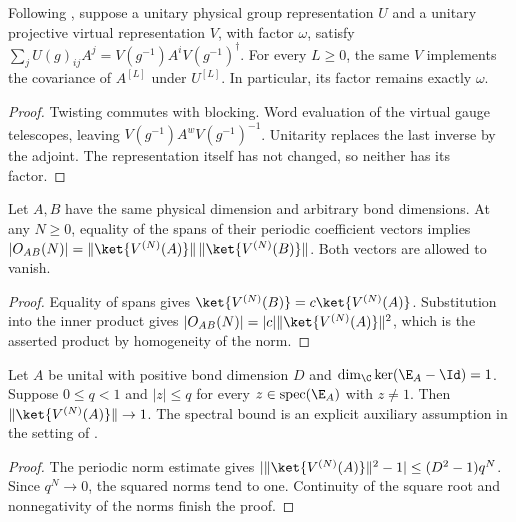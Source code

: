 \begin{lemma}
    \label{thm:spc_aux_blocked_unitary_covariance}
    \leanok
    Following \cite[Appendix~C, lines~2653--2717]{Schuch2011Phases}, suppose
    a unitary physical group representation $U$ and a unitary
    projective virtual representation $V$, with factor $\omega$, satisfy
    $\sum_jU(g)_{ij}A^j=V(g^{-1})A^iV(g^{-1})^\dagger$.
    For every $L\geq0$, the same $V$ implements the covariance of $A^{[L]}$
    under $U^{[L]}$. In particular, its factor remains exactly $\omega$.
\end{lemma}
\begin{proof}\leanok
    Twisting commutes with blocking. Word evaluation of the virtual gauge
    telescopes, leaving $V(g^{-1})A^wV(g^{-1})^{-1}$.
    Unitarity replaces the last inverse by the adjoint. The representation
    itself has not changed, so neither has its factor.
\end{proof}

\begin{lemma}
    \label{thm:spc_aux_periodic_span_overlap}
    \leanok
    Let $A,B$ have the same physical dimension and arbitrary bond dimensions.
    At any $N\geq0$, equality of the spans of their periodic coefficient
    vectors implies
    $|O_{AB}(N)|=\|\ket{V^{(N)}(A)}\|\,\|\ket{V^{(N)}(B)}\|$.
    Both vectors are allowed to vanish.
\end{lemma}
\begin{proof}\leanok
    Equality of spans gives $\ket{V^{(N)}(B)}=c\ket{V^{(N)}(A)}$.
    Substitution into the inner product gives
    $|O_{AB}(N)|=|c|\|\ket{V^{(N)}(A)}\|^2$, which is the asserted
    product by homogeneity of the norm.
\end{proof}

\begin{lemma}
    \label{thm:spc_aux_periodic_norm_one}
    \leanok
    Let $A$ be unital with positive bond dimension $D$ and
    $\dim_{\C}\ker(\E_A-\Id)=1$.
    Suppose $0\leq q<1$ and $|z|\leq q$ for every
    $z\in\operatorname{spec}(\E_A)$ with $z\ne1$.
    Then $\|\ket{V^{(N)}(A)}\|\to1$.
    The spectral bound is an explicit auxiliary assumption in the setting
    of \cite[Appendix~C, lines~2653--2717]{Schuch2011Phases}.
\end{lemma}
\begin{proof}\leanok
    The periodic norm estimate gives
    $|\|\ket{V^{(N)}(A)}\|^2-1|\leq(D^2-1)q^N$.
    Since $q^N\to0$, the squared norms tend to one. Continuity of the square
    root and nonnegativity of the norms finish the proof.
\end{proof}

